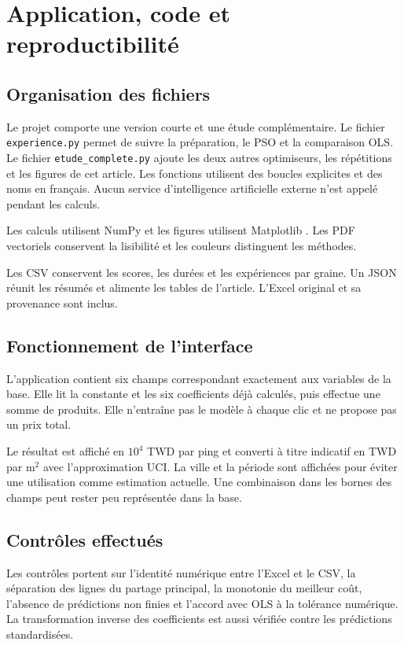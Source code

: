 \documentclass[conference,a4paper]{IEEEtran}
\begin{document}
\section{Application, code et reproductibilité}
\subsection{Organisation des fichiers}
Le projet comporte une version courte et une étude complémentaire. Le fichier \texttt{experience.py} permet de suivre la préparation, le PSO et la comparaison OLS. Le fichier \texttt{etude\_complete.py} ajoute les deux autres optimiseurs, les répétitions et les figures de cet article. Les fonctions utilisent des boucles explicites et des noms en français. Aucun service d'intelligence artificielle externe n'est appelé pendant les calculs.

Les calculs utilisent NumPy \cite{numpy} et les figures utilisent Matplotlib \cite{matplotlib}. Les PDF vectoriels conservent la lisibilité et les couleurs distinguent les méthodes.

Les CSV conservent les scores, les durées et les expériences par graine. Un JSON réunit les résumés et alimente les tables de l'article. L'Excel original et sa provenance sont inclus.
\subsection{Fonctionnement de l'interface}
L'application contient six champs correspondant exactement aux variables de la base. Elle lit la constante et les six coefficients déjà calculés, puis effectue une somme de produits. Elle n'entraîne pas le modèle à chaque clic et ne propose pas un prix total.

Le résultat est affiché en $10^4$ TWD par ping et converti à titre indicatif en TWD par m$^2$ avec l'approximation UCI. La ville et la période sont affichées pour éviter une utilisation comme estimation actuelle. Une combinaison dans les bornes des champs peut rester peu représentée dans la base.
\subsection{Contrôles effectués}
Les contrôles portent sur l'identité numérique entre l'Excel et le CSV, la séparation des lignes du partage principal, la monotonie du meilleur coût, l'absence de prédictions non finies et l'accord avec OLS à la tolérance numérique. La transformation inverse des coefficients est aussi vérifiée contre les prédictions standardisées.
\end{document}
